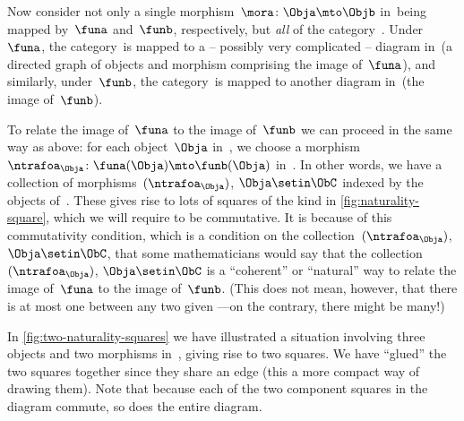 \vspace{7mm}


%

Now consider not only a single morphism~$\mora \colon \Obja \mto \Objb$ in~\CatC being mapped by~$\funa$ and~$\funb$, respectively, but \emph{all} of the category~\CatC.
Under~$\funa$, the category~\CatC is mapped to a -- possibly very complicated -- diagram in~\CatD (a directed graph of objects and morphism comprising the image of~$\funa$), and similarly, under~$\funb$, the category~\CatC is mapped to another diagram in~\CatD (the image of~$\funb$).

To relate the image of~$\funa$ to the image of~$\funb$ we can proceed in the same way as above: for each object~$\Obja$ in~\CatC, we choose a morphism~$\ntrafoa_\Obja \colon \funa(\Obja) \mto \funb(\Obja)$ in~\CatD.
In other words, we have a collection of morphisms~$(\ntrafoa_\Obja)$, ${\Obja \setin \ObC}$ indexed by the objects of~\CatC.
These gives rise to lots of squares of the kind in \cref{fig:naturality-square}, which we will require to be commutative.
It is because of this commutativity condition, which is a condition on the collection~$(\ntrafoa_\Obja)$, ${\Obja \setin \ObC}$, that some mathematicians would say that the collection~$(\ntrafoa_\Obja)$, ${\Obja \setin \ObC}$ is a ``coherent'' or ``natural'' way to relate the image of~$\funa$ to the image of~$\funb$.
(This does not mean, however, that there is at most one  between any two given ---on the contrary, there might be many!)

\begin{marginfigure}
    \centering
    \caption{}
    \label{fig:two-naturality-squares}
\end{marginfigure}

In \cref{fig:two-naturality-squares} we have illustrated a situation involving three objects and two morphisms in~\CatC, giving rise to two squares.
We have ``glued'' the two squares together since they share an edge (this a more compact way of drawing them).
Note that because each of the two component squares in the diagram commute, so does the entire diagram.

